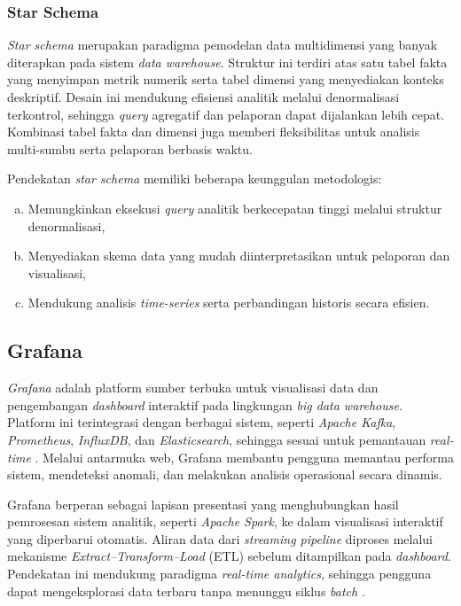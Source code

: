 \subsubsection{Star Schema}

\textit{Star schema} merupakan paradigma pemodelan data multidimensi yang
banyak diterapkan pada sistem \textit{data warehouse}. Struktur ini terdiri
atas satu tabel fakta yang menyimpan metrik numerik serta tabel dimensi yang
menyediakan konteks deskriptif. Desain ini mendukung efisiensi analitik
melalui denormalisasi terkontrol, sehingga \textit{query} agregatif dan
pelaporan dapat dijalankan lebih cepat. Kombinasi tabel fakta dan dimensi juga
memberi fleksibilitas untuk analisis multi-sumbu serta pelaporan berbasis
waktu.

Pendekatan \textit{star schema} memiliki beberapa keunggulan metodologis:
\begin{enumerate}[a.]
\item Memungkinkan eksekusi \textit{query} analitik berkecepatan tinggi melalui struktur denormalisasi,
\item Menyediakan skema data yang mudah diinterpretasikan untuk pelaporan dan visualisasi,
\item Mendukung analisis \textit{time-series} serta perbandingan historis secara efisien.
\end{enumerate}

\subsection{Grafana}

\textit{Grafana} adalah platform sumber terbuka untuk visualisasi data dan
pengembangan \textit{dashboard} interaktif pada lingkungan
\textit{big data warehouse}. Platform ini terintegrasi dengan berbagai sistem,
seperti \textit{Apache Kafka}, \textit{Prometheus}, \textit{InfluxDB}, dan
\textit{Elasticsearch}, sehingga sesuai untuk pemantauan \textit{real-time}
\cite{sutanto2025wazuhgrafana}. Melalui antarmuka web, Grafana membantu pengguna
memantau performa sistem, mendeteksi anomali, dan melakukan analisis
operasional secara dinamis.

Grafana berperan sebagai lapisan presentasi yang menghubungkan hasil
pemrosesan sistem analitik, seperti \textit{Apache Spark}, ke dalam
visualisasi interaktif yang diperbarui otomatis. Aliran data dari
\textit{streaming pipeline} diproses melalui mekanisme
\textit{Extract--Transform--Load} (ETL) sebelum ditampilkan pada \textit{dashboard}.
Pendekatan ini mendukung paradigma \textit{real-time analytics}, sehingga
pengguna dapat mengeksplorasi data terbaru tanpa menunggu siklus
\textit{batch} \cite{devireddy2020realtimewarehouse}.

